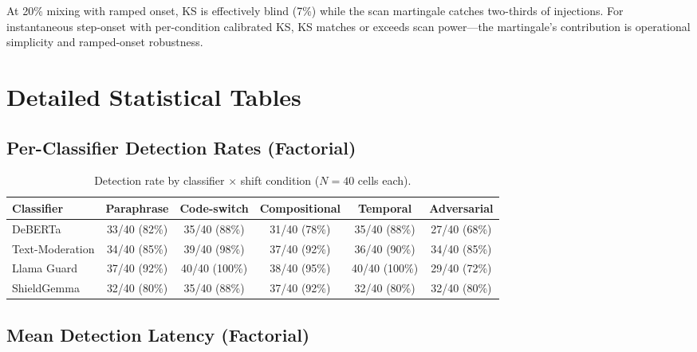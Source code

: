 \documentclass{article}
\begin{document}
At 20\% mixing with ramped onset, KS is effectively blind (7\%) while the scan martingale catches two-thirds of injections. For instantaneous step-onset with per-condition calibrated KS, KS matches or exceeds scan power---the martingale's contribution is operational simplicity and ramped-onset robustness.


\section{Detailed Statistical Tables}
\label{app:tables}

\subsection{Per-Classifier Detection Rates (Factorial)}

\begin{table}[h]
\caption{Detection rate by classifier $\times$ shift condition ($N{=}40$ cells each).}
\centering
\small
\begin{tabular}{lccccc}
\toprule
\textbf{Classifier} & \textbf{Paraphrase} & \textbf{Code-switch} & \textbf{Compositional} & \textbf{Temporal} & \textbf{Adversarial} \\
\midrule
DeBERTa & 33/40 (82\%) & 35/40 (88\%) & 31/40 (78\%) & 35/40 (88\%) & 27/40 (68\%) \\
Text-Moderation & 34/40 (85\%) & 39/40 (98\%) & 37/40 (92\%) & 36/40 (90\%) & 34/40 (85\%) \\
Llama Guard & 37/40 (92\%) & 40/40 (100\%) & 38/40 (95\%) & 40/40 (100\%) & 29/40 (72\%) \\
ShieldGemma & 32/40 (80\%) & 35/40 (88\%) & 37/40 (92\%) & 32/40 (80\%) & 32/40 (80\%) \\
\bottomrule
\end{tabular}
\end{table}

\subsection{Mean Detection Latency (Factorial)}
\end{document}
